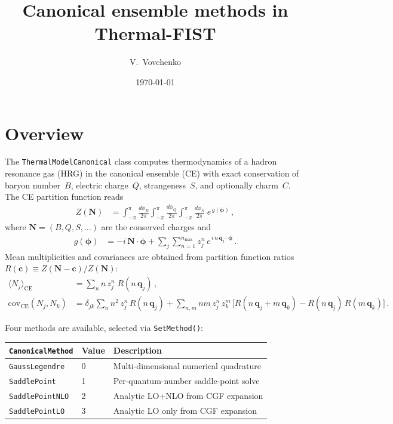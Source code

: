 \documentclass[11pt]{article}
\title{\Large \bf Canonical ensemble methods in Thermal-FIST}
\author{V.~Vovchenko}
\date{\today}
\newcommand{\bphi}{\bm{\phi}}
\newcommand{\bq}{\mathbf{q}}
\newcommand{\bc}{\mathbf{c}}
\newcommand{\bN}{\mathbf{N}}
\newcommand{\CE}{\mathrm{CE}}
\newcommand{\covv}{\mathrm{cov}}
\begin{document}
\maketitle

\section{Overview}

The \texttt{ThermalModelCanonical} class computes thermodynamics of a hadron resonance gas (HRG) in the canonical ensemble (CE) with exact conservation of baryon number~$B$, electric charge~$Q$, strangeness~$S$, and optionally charm~$C$.
The CE partition function reads
\begin{align}
  Z(\bN) &= \int_{-\pi}^{\pi}\!\frac{d\phi_B}{2\pi}
             \int_{-\pi}^{\pi}\!\frac{d\phi_Q}{2\pi}
             \int_{-\pi}^{\pi}\!\frac{d\phi_S}{2\pi}\;
             e^{\,g(\bphi)} \,,
  \label{eq:ZCE}
\end{align}
where $\bN = (B,Q,S,\ldots)$ are the conserved charges and
\begin{align}
  g(\bphi) &= -i\,\bN\!\cdot\!\bphi
              + \sum_j \sum_{n=1}^{n_\mathrm{max}} z_j^n\,
                e^{\,i\,n\,\bq_j\cdot\bphi} \,.
  \label{eq:gdef}
\end{align}
Mean multiplicities and covariances are obtained from partition function ratios $R(\bc) \equiv Z(\bN - \bc)/Z(\bN)$:
\begin{align}
  \langle N_j\rangle_\CE
  &= \sum_{n} n\,z_j^n\;R(n\,\bq_j) \,,
  \label{eq:Nce}\\
  \covv_\CE(N_j, N_k)
  &= \delta_{jk}\sum_n n^2\,z_j^n\,R(n\,\bq_j)
    + \sum_{n,m} nm\,z_j^n\,z_k^m\,
      \Big[R(n\,\bq_j + m\,\bq_k) - R(n\,\bq_j)\,R(m\,\bq_k)\Big] \,.
  \label{eq:cov_exact}
\end{align}

Four methods are available, selected via \texttt{SetMethod()}:
\begin{center}
\begin{tabular}{lll}
\toprule
\texttt{CanonicalMethod} & Value & Description \\
\midrule
\texttt{GaussLegendre}  & 0 & Multi-dimensional numerical quadrature \\
\texttt{SaddlePoint}     & 1 & Per-quantum-number saddle-point solve \\
\texttt{SaddlePointNLO}  & 2 & Analytic LO+NLO from CGF expansion \\
\texttt{SaddlePointLO}   & 3 & Analytic LO only from CGF expansion \\
\bottomrule
\end{tabular}
\end{center}
\end{document}
